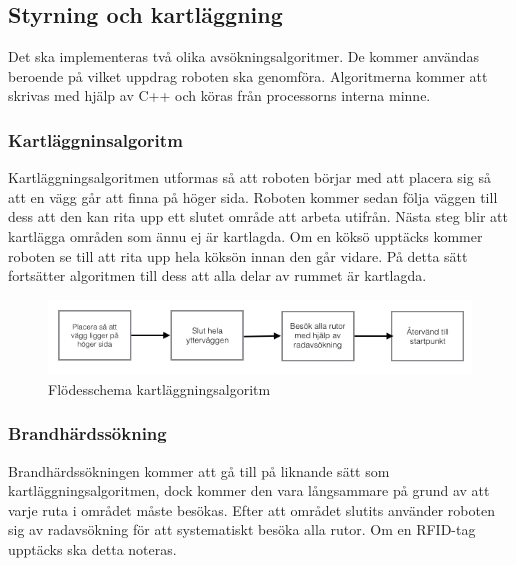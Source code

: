 \documentclass[a4paper,12pt,fleqn]{article}
\begin{document}
\newpage

\subsection{Styrning och kartläggning}
Det ska implementeras två olika avsökningsalgoritmer. De kommer användas beroende på vilket uppdrag roboten ska genomföra. Algoritmerna kommer att skrivas med hjälp av C++ och köras från processorns interna minne. 

\subsubsection{Kartläggninsalgoritm}

Kartläggningsalgoritmen utformas så att roboten börjar med att placera sig så att en vägg går att finna på höger sida. Roboten kommer sedan följa väggen till dess att den kan rita upp ett slutet område att arbeta utifrån. Nästa steg blir att kartlägga områden som ännu ej är kartlagda. Om en köksö upptäcks kommer roboten se till att rita upp hela köksön innan den går vidare. På detta sätt fortsätter algoritmen till dess att alla delar av rummet är kartlagda. 

\begin{figure}[htp] %
  \begin{center}
  \includegraphics[keepaspectratio=true,scale=0.5]{bilder/flode_brandhard.jpg}  %
  \end{center}
  \caption{Flödesschema kartläggningsalgoritm} %
  \label{fig:map} %
\end{figure}

\newpage

\subsubsection{Brandhärdssökning}

Brandhärdssökningen kommer att gå till på liknande sätt som kartläggningsalgoritmen, dock kommer den vara långsammare på grund av att varje ruta i området måste besökas. Efter att området slutits använder roboten sig av radavsökning för att systematiskt besöka alla rutor. Om en RFID-tag upptäcks ska detta noteras.
\end{document}
